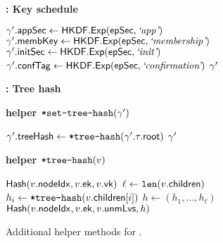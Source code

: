 \begin{figure*}[!p]
\begin{tcbraster}[raster columns=2, raster equal height]
\begin{anybox}{\sffamily\bfseries \saik : Key schedule}
\begin{minipage}[t]{\linewidth}
\begin{algorithmic}
						\State $\gamma'.{\mathsf{appSec}} \gets {\ensuremath{\mathsf{HKDF}}}.{\mathsf{Exp}}({\mathsf{epSec}}, {\text{\normalfont \it`app'}})$
						\State $\gamma'.{\mathsf{membKey}} \gets {\ensuremath{\mathsf{HKDF}}}.{\mathsf{Exp}}({\mathsf{epSec}}, {\text{\normalfont \it`membership'}})$
						\State $\gamma'.{\mathsf{initSec}} \gets {\ensuremath{\mathsf{HKDF}}}.{\mathsf{Exp}}({\mathsf{epSec}}, {\text{\normalfont \it`init'}})$
            \State $\gamma'.{\mathsf{confTag}} \gets {\ensuremath{\mathsf{HKDF}}}.{\mathsf{Exp}}({\mathsf{epSec}}, {\text{\normalfont \it`confirmation'}})$
						\State \Return $\gamma'$
					\end{algorithmic}
				\end{minipage}
		\end{anybox}
		\begin{anybox}{\sffamily\bfseries \saik : Tree hash}
				\begin{minipage}[t]{\linewidth}
					{\bf {helper ${{\textnormal{\tt*set-tree-hash}}}(\gamma')$}}
        \begin{algorithmic}
					\State $\gamma'.{\mathsf{treeHash}} \gets {{\ensuremath{\textnormal{\tt*tree-hash}}}}(\gamma'.\tau.{\mathsf{root}})$
					\State \Return $\gamma'$
				\end{algorithmic}

        \medskip
        {\bf {helper ${{\textnormal{\tt*tree-hash}}}(v)$}}
				\begin{algorithmic}
					  \State \Return ${\mathsf{Hash}}(v.{\mathsf{nodeIdx}}, v.{\mathsf{ek}}, v.{\mathsf{vk}})$
					\Else
            \State $\ell \gets \texttt{len}(v.{\mathsf{children}})$
  					  $h_i \gets {{\ensuremath{\textnormal{\tt*tree-hash}}}}(v.{\mathsf{children}}[i])$
            \EndFor
            \State $h \gets (h_1, \dots, h_\ell)$
            \State \Return ${\mathsf{Hash}}(v.{\mathsf{nodeIdx}}, v.{\mathsf{ek}}, v.{\mathsf{unmLvs}}, h)$
					\EndIf
				\end{algorithmic}
				\end{minipage}
		\end{anybox}
	\end{tcbraster}

	\caption{Additional helper methods for \saik.}
	\label{fig:prot-helpers2}
\end{figure*}

